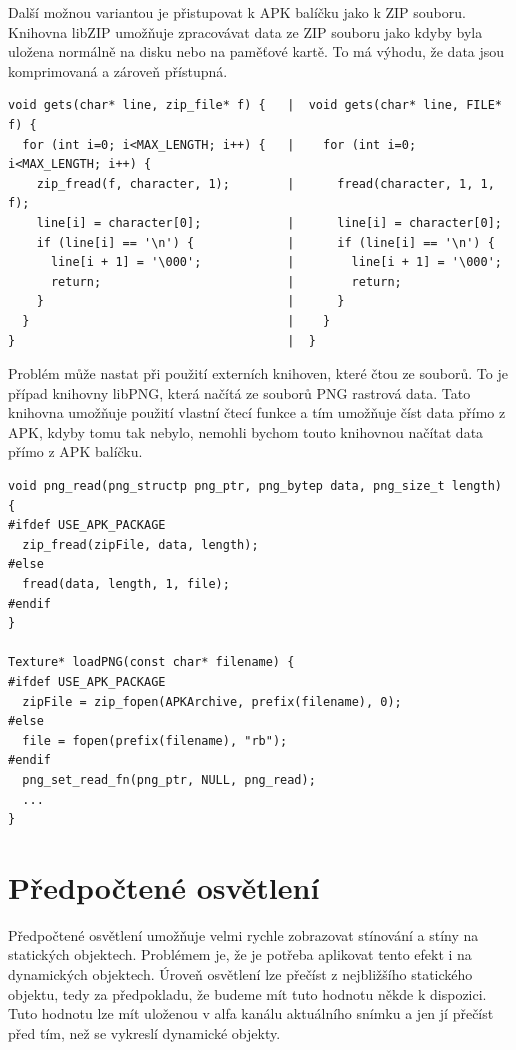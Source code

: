 \documentclass[11pt,twoside,a4paper]{book}
\begin{document}
Další možnou variantou je přistupovat k APK balíčku jako k ZIP souboru. Knihovna libZIP umožňuje zpracovávat data ze ZIP souboru jako kdyby byla uložena normálně na disku nebo na paměťové kartě. To má výhodu, že data jsou komprimovaná a zároveň přístupná.
\lstset{language=C++} 
\begin{lstlisting}[caption=Čtení řádky z APK balíčku (vlevo) a ze souboru (vpravo)]
void gets(char* line, zip_file* f) {   |  void gets(char* line, FILE* f) {
  for (int i=0; i<MAX_LENGTH; i++) {   |    for (int i=0; i<MAX_LENGTH; i++) {
    zip_fread(f, character, 1);        |      fread(character, 1, 1, f);
    line[i] = character[0];            |      line[i] = character[0];
    if (line[i] == '\n') {             |      if (line[i] == '\n') {
      line[i + 1] = '\000';            |        line[i + 1] = '\000';
      return;                          |        return;
    }                                  |      }  
  }                                    |    }      
}                                      |  }   
\end{lstlisting}

Problém může nastat při použití externích knihoven, které čtou ze souborů. To je případ knihovny libPNG, která načítá ze souborů PNG rastrová data. Tato knihovna umožňuje použití vlastní čtecí funkce a tím umožňuje číst data přímo z APK, kdyby tomu tak nebylo, nemohli bychom touto knihovnou načítat data přímo z APK balíčku.

\lstset{language=C++} 
\begin{lstlisting}[caption=Použití vlastní čtecí funkce při použití knihovny libPNG]
void png_read(png_structp png_ptr, png_bytep data, png_size_t length) {
#ifdef USE_APK_PACKAGE
  zip_fread(zipFile, data, length);
#else
  fread(data, length, 1, file);
#endif
}

Texture* loadPNG(const char* filename) {
#ifdef USE_APK_PACKAGE
  zipFile = zip_fopen(APKArchive, prefix(filename), 0);
#else
  file = fopen(prefix(filename), "rb");
#endif
  png_set_read_fn(png_ptr, NULL, png_read);
  ...
}
\end{lstlisting}

\section{Předpočtené osvětlení}
Předpočtené osvětlení umožňuje velmi rychle zobrazovat stínování a stíny na statických objektech. Problémem je, že je potřeba aplikovat tento efekt i na dynamických objektech. Úroveň osvětlení lze přečíst z nejbližšího statického objektu, tedy za předpokladu, že budeme mít tuto hodnotu někde k dispozici. Tuto hodnotu lze mít uloženou v alfa kanálu aktuálního snímku a jen jí přečíst před tím, než se vykreslí dynamické objekty.
\end{document}
